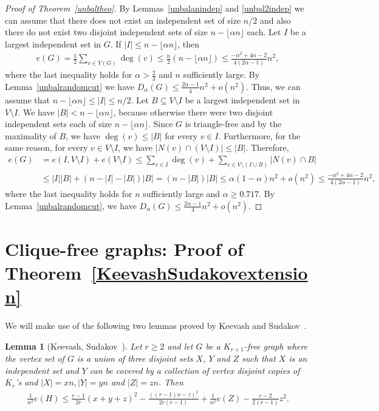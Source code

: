 \documentclass[11pt]{article}
\newtheorem{lemma}[theo]{Lemma}
\theoremstyle{definition}
\numberwithin{theo}{section}
\begin{document}
\begin{proof}[Proof of Theorem~\ref{unbaltheo}]
By Lemmas~\ref{unbalanindep} and \ref{unbal2indep} we can assume that there does not exist an independent set of size $n/2$ and also there do not exist two disjoint independent sets of size $n-\lfloor\alpha n\rfloor$ each. Let $I$ be a largest independent set in $G$. If $|I|\leq n-\lfloor\alpha n\rfloor$, then
\begin{align*}
    e(G)=\frac{1}{2}\sum_{v\in V(G)}\deg(v)\leq \frac{n}{2}(n-\lfloor\alpha n\rfloor)\leq \frac{-\alpha^2+4\alpha-2}{4(2\alpha-1)}n^2,
\end{align*}
where the last inequality holds for $\alpha> \frac{2}{3}$ and $n$ sufficiently large. By Lemma~\ref{unbalrandomcut} we have $D_\alpha(G)\leq \frac{2\alpha-1}{4}n^2+o(n^2)$. Thus, we can assume that $n-\lfloor\alpha n\rfloor\leq|I|\leq n/2$. Let $B\subseteq V\setminus I$ be a largest independent set in $V\setminus I$. We have $|B|< n-\lfloor\alpha n\rfloor$, because otherwise there were two disjoint independent sets each of size $n-\lfloor \alpha n\rfloor$. Since $G$ is triangle-free and by the maximality of $B$, we have $\deg(v)\leq |B|$ for every $v\in I$. Furthermore, for the same reason, for every $v\in V\setminus I$, we have $|N(v)\cap (V\setminus I)|\leq |B|$. Therefore, 
\begin{align*}
    e(G)&=e(I,V\setminus I) +e(V\setminus I)\leq\sum_{v\in I}\deg(v)+\sum_{v\in V\setminus(I\cup B)}|N(v)\cap B|\\
    &\leq |I||B|+(n-|I|-|B|)|B|=(n-|B|)|B|
    \leq \alpha (1-\alpha)n^2+o(n^2)\leq \frac{-\alpha^2+4\alpha-2}{4(2\alpha-1)}n^2,
\end{align*}
where the last inequality holds for $n$ sufficiently large and $\alpha\geq 0.717$.
By Lemma~\ref{unbalrandomcut}, we have $D_\alpha(G)\leq \frac{2\alpha-1}{4}n^2+o(n^2)$.
\end{proof}




\section{Clique-free graphs: Proof of Theorem~\ref{KeevashSudakovextension}}
\label{sec:clique-freegraphs}

We will make use of the following two lemmas proved by Keevash and Sudakov~\cite{MR1967401}.
\begin{lemma}[Keevash, Sudakov~\cite{MR1967401}]
\label{lem: edgesinpartitiongraph}
Let $r\geq2$ and let $G$ be a $K_{r+1}$-free graph where the vertex set of $G$ is a union of three disjoint sets $X$, $Y$ and $Z$ such that $X$ is an independent set and $Y$ can be covered by a collection of vertex disjoint copies of $K_r$'s and $|X| = xn, |Y | = yn$ and $|Z| = zn$. Then
\begin{align*}
    \frac{1}{n^2}e(H)\leq \frac{r-1}{2r}(x+y+z)^2-\frac{((r-1)x-z)^2}{2r(r-1)}+\frac{1}{n^2}e(Z)-\frac{r-2}{2(r-1)}z^2.
\end{align*}
\end{lemma}
\end{document}
